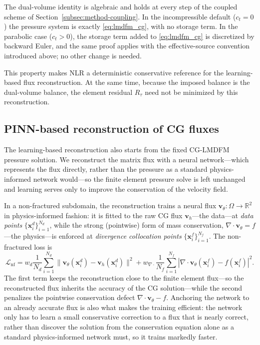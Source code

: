 \documentclass[a4paper,fleqn]{cas-sc}
\newcommand{\vflux}{\mathbf{v}}
\begin{document}
The dual-volume identity is algebraic and holds at every step of the coupled
scheme of Section~\ref{subsec:method-coupling}. In the incompressible default
(\(c_t=0\)) the pressure system is exactly \eqref{eq:lmdfm_cg}, with no storage
term. In the parabolic case (\(c_t>0\)), the storage term added to
\eqref{eq:lmdfm_cg} is discretized by backward Euler, and the same proof applies
with the effective-source convention introduced above; no other change is needed.

This property makes NLR a deterministic conservative reference for the
learning-based flux reconstruction. At the same time, because the imposed
balance is the dual-volume balance, the element residual \(R_\tau\) need not be
minimized by this reconstruction.

\subsection{PINN-based reconstruction of CG fluxes}
\label{subsec:pinn-reconstruction}

The learning-based reconstruction also starts from the fixed CG-LMDFM pressure
solution. We reconstruct the matrix flux with a neural network---which represents
the flux directly, rather than the pressure as a standard physics-informed
network would---so the finite element pressure solve is left unchanged and
learning serves only to improve the conservation of the velocity field.

In a non-fractured subdomain, the reconstruction trains a neural flux
\(\vflux_\theta:\Omega\to\mathbb{R}^2\) in physics-informed fashion: it is fitted
to the raw CG flux \(\vflux_h\)---the data---at \emph{data points}
\(\{\mathbf{x}_i^d\}_{i=1}^{N_d}\), while the strong (pointwise) form of mass
conservation, \(\nabla\cdot\vflux_\theta=f\)---the physics---is enforced at
\emph{divergence collocation points} \(\{\mathbf{x}_i^f\}_{i=1}^{N_f}\). The
non-fractured loss is
\begin{equation}
\mathcal{L}_{\mathrm{nf}}
=
w_d\frac{1}{N_d}\sum_{i=1}^{N_d}
\|\vflux_\theta(\mathbf{x}_i^d)-\vflux_h(\mathbf{x}_i^d)\|^2
+
w_{\nabla\cdot}\frac{1}{N_f}\sum_{i=1}^{N_f}
\left|\nabla\cdot\vflux_\theta(\mathbf{x}_i^f)-f(\mathbf{x}_i^f)\right|^2 .
\label{eq:pinn_rec_nonfractured}
\end{equation}
The first term keeps the reconstruction close to the finite element flux---so the
reconstructed flux inherits the accuracy of the CG solution---while the second
penalizes the pointwise conservation defect \(\nabla\cdot\vflux_\theta-f\).
Anchoring the network to an already accurate flux is also what makes the training
efficient: the network only has to learn a small conservative correction to a flux
that is nearly correct, rather than discover the solution from the conservation
equation alone as a standard physics-informed network must, so it trains markedly
faster.
\end{document}
